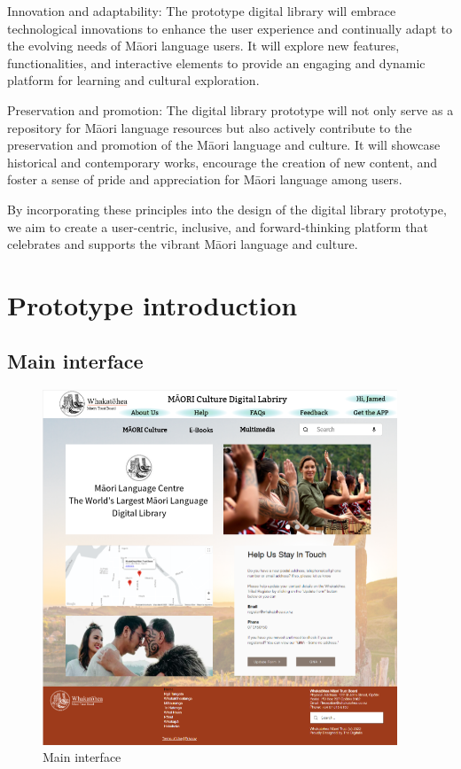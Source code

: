 Innovation and adaptability: The prototype digital library will embrace technological innovations to enhance the user experience and continually adapt to the evolving needs of Māori language users. It will explore new features, functionalities, and interactive elements to provide an engaging and dynamic platform for learning and cultural exploration.

Preservation and promotion: The digital library prototype will not only serve as a repository for Māori language resources but also actively contribute to the preservation and promotion of the Māori language and culture. It will showcase historical and contemporary works, encourage the creation of new content, and foster a sense of pride and appreciation for Māori language among users.

By incorporating these principles into the design of the digital library prototype, we aim to create a user-centric, inclusive, and forward-thinking platform that celebrates and supports the vibrant Māori language and culture.

\section{Prototype introduction}

\subsection{Main interface}

\begin{figure}[htbp]
  \centerline{\includegraphics[width=300pt]{images/3-1-1.png}}
  \caption{Main interface}
  \label{fig3.1.1}
\end{figure}

